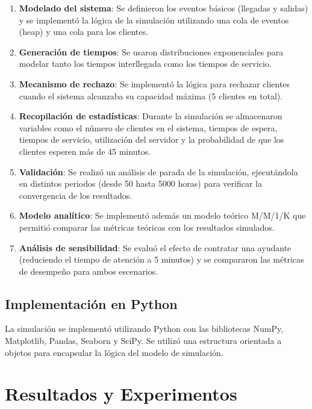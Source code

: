 \documentclass[12pt,a4paper]{article}
\begin{document}
\begin{enumerate}
    \item \textbf{Modelado del sistema}: Se definieron los eventos básicos (llegadas y salidas) y se implementó la lógica de la simulación utilizando una cola de eventos (heap) y una cola para los clientes.
    
    \item \textbf{Generación de tiempos}: Se usaron distribuciones exponenciales para modelar tanto los tiempos interllegada como los tiempos de servicio.
    
    \item \textbf{Mecanismo de rechazo}: Se implementó la lógica para rechazar clientes cuando el sistema alcanzaba su capacidad máxima (5 clientes en total).
    
    \item \textbf{Recopilación de estadísticas}: Durante la simulación se almacenaron variables como el número de clientes en el sistema, tiempos de espera, tiempos de servicio, utilización del servidor y la probabilidad de que los clientes esperen más de 45 minutos.
    
    \item \textbf{Validación}: Se realizó un análisis de parada de la simulación, ejecutándola en distintos periodos (desde 50 hasta 5000 horas) para verificar la convergencia de los resultados.
    
    \item \textbf{Modelo analítico}: Se implementó además un modelo teórico M/M/1/K que permitió comparar las métricas teóricas con los resultados simulados.
    
    \item \textbf{Análisis de sensibilidad}: Se evaluó el efecto de contratar una ayudante (reduciendo el tiempo de atención a 5 minutos) y se compararon las métricas de desempeño para ambos escenarios.
\end{enumerate}

\subsection{Implementación en Python}
La simulación se implementó utilizando Python con las bibliotecas NumPy, Matplotlib, Pandas, Seaborn y SciPy. Se utilizó una estructura orientada a objetos para encapsular la lógica del modelo de simulación.

\section{Resultados y Experimentos}
\end{document}
